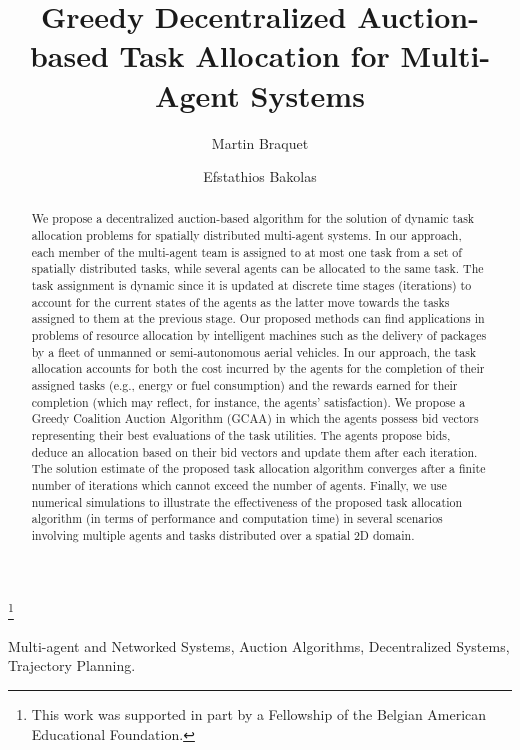 \documentclass{ifacconf}
\begin{document}
\begin{frontmatter}

\title{Greedy Decentralized Auction-based Task Allocation for Multi-Agent Systems }

\thanks[footnoteinfo]{This work was supported in part by a Fellowship of the Belgian American Educational Foundation.}

\author[First]{Martin Braquet} 
\author[First]{Efstathios Bakolas} 

\address[First]{Department of Aerospace Engineering and Engineering Mechanics, The University of Texas at Austin, Austin, Texas 78712-1221, USA (e-mail: braquet@utexas.edu, bakolas@austin.utexas.edu).}

\begin{abstract}
We propose a decentralized auction-based algorithm for the solution of dynamic task allocation problems for spatially distributed multi-agent systems. In our approach, each member of the multi-agent team is assigned to at most one task from a set of spatially distributed tasks, while several agents can be allocated to the same task. The task assignment is dynamic since it is updated at discrete time stages (iterations) to account for the current states of the agents as the latter move towards the tasks assigned to them at the previous stage. Our proposed methods can find applications in problems of resource allocation by intelligent machines such as the delivery of packages by a fleet of unmanned or semi-autonomous aerial vehicles. In our approach, the task allocation accounts for both the cost incurred by the agents for the completion of their assigned tasks (e.g., energy or fuel consumption) and the rewards earned for their completion (which may reflect, for instance, the agents' satisfaction). We propose a Greedy Coalition Auction Algorithm (GCAA) in which the agents possess bid vectors representing their best evaluations of the task utilities. The agents propose bids, deduce an allocation based on their bid vectors and update them after each iteration. The solution estimate of the proposed task allocation algorithm converges after a finite number of iterations which cannot exceed the number of agents. Finally, we use numerical simulations to illustrate the effectiveness of the proposed task allocation algorithm (in terms of performance and computation time) in several scenarios involving multiple agents and tasks distributed over a spatial 2D domain.
\end{abstract}

\begin{keyword}
Multi-agent and Networked Systems, Auction Algorithms, Decentralized Systems, Trajectory Planning.
\end{keyword}

\end{frontmatter}
\end{document}
